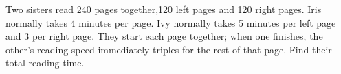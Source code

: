 Two sisters read 240 pages together,120 left pages and 120 right pages. Iris normally takes 4 minutes per page. Ivy normally takes 5 minutes per left page and 3 per right page. They start each page together; when one finishes, the other's reading speed immediately triples for the rest of that page. Find their total reading time.
